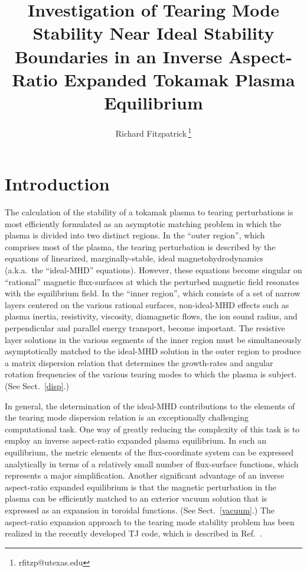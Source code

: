 \documentclass[12pt,prb,aps]{revtex4-1}
\begin{document}
\title{Investigation of  Tearing Mode Stability Near Ideal Stability Boundaries in an Inverse Aspect-Ratio Expanded Tokamak Plasma Equilibrium}
\author{Richard Fitzpatrick\,\footnote{rfitzp@utexas.edu}}

\begin{abstract}

\end{abstract}
\maketitle

\section{Introduction} 
The calculation of the stability of a tokamak plasma to tearing perturbations is most efficiently formulated as  an asymptotic
matching problem in which the  plasma is  divided into two distinct regions.\cite{fkr}  In the ``outer region'', which comprises most
of the plasma, the tearing perturbation is described by the equations of linearized, marginally-stable, ideal magnetohydrodynamics (a.k.a.\ the ``ideal-MHD'' equations). 
However, these equations become singular on   ``rational'' magnetic flux-surfaces at which the perturbed magnetic field resonates with the equilibrium field. In the ``inner region'', which
consists of a set of narrow layers centered on the various rational surfaces, non-ideal-MHD effects such as plasma inertia, resistivity, 
viscosity,  diamagnetic flows, the ion sound radius,  and perpendicular and parallel energy transport, become important.\cite{hkm,fw,cole,diff}  The resistive layer
solutions in the various segments of the inner region must be simultaneously asymptotically matched to the ideal-MHD solution in the outer region to produce a matrix 
dispersion relation that determines the growth-rates and angular rotation frequencies of the various tearing modes to which the plasma is subject.\cite{con0,cht} (See Sect.~\ref{disp}.)

In general, the  determination of the ideal-MHD contributions to the elements of the  tearing mode dispersion relation is an exceptionally challenging computational task.\cite{connor,nish,gal,pletz,pletz1,
tokuda,brennan,ham,ham1,ham2,am1,am2,am3,aglas,aglas1,aglas2}
One way of greatly reducing the complexity of this task is to employ an inverse aspect-ratio expanded plasma equilibrium.\cite{greene,gim,inverse} In such an equilibrium,
the metric elements of the flux-coordinate system can be expressed analytically in terms of a relatively small number of  flux-surface functions,
which represents a major simplification.\cite{con0} Another significant advantage of an inverse aspect-ratio expanded equilibrium is that the magnetic perturbation in the plasma can be efficiently 
matched to an exterior vacuum solution  that is expressed as an expansion in toroidal functions.\cite{am1} (See Sect.~\ref{vacuum}.) The aspect-ratio expansion approach to the tearing mode stability problem has been realized in the recently developed TJ code,
which is described in Ref.~.
\end{document}
